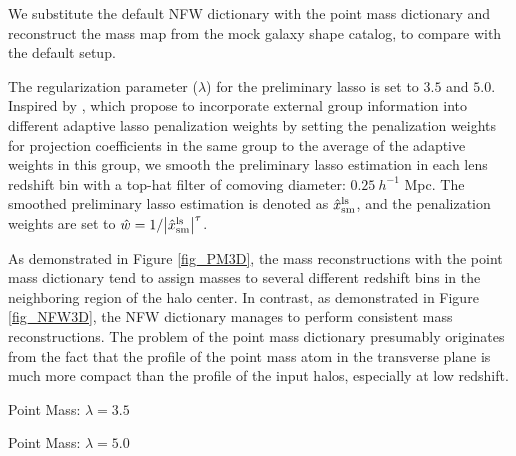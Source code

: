 
We substitute the default NFW dictionary with the point mass dictionary and
reconstruct the mass map from the mock galaxy shape catalog, to compare with
the default setup.

The regularization parameter ($\lambda$) for the preliminary lasso is set to
$3.5$ and $5.0$.  Inspired by \citet{structureAdaLasso-Pramanik2020}, which
propose to incorporate external group information into different adaptive lasso
penalization weights by setting the penalization weights for projection
coefficients in the same group to the average of the adaptive weights in this
group, we smooth the preliminary lasso estimation in each lens redshift bin
with a top-hat filter of comoving diameter: $0.25~h^{-1}$ Mpc. The smoothed
preliminary lasso estimation is denoted as $\hat{x}^{\rm{ls}}_{\rm{sm}}$, and
the penalization weights are set to
$\hat{w}=1/\abs{\hat{x}^{\rm{ls}}_{\rm{sm}}}^\tau$.

As demonstrated in Figure \ref{fig_PM3D}, the mass reconstructions with the
point mass dictionary tend to assign masses to several different redshift bins
in the neighboring region of the halo center.  In contrast, as demonstrated in
Figure \ref{fig_NFW3D}, the NFW dictionary manages to perform consistent mass
reconstructions. The problem of the point mass dictionary presumably originates
from the fact that the profile of the point mass atom in the transverse plane
is much more compact than the profile of the input halos, especially at low
redshift.

\begin{figure*}
\centering
\begin{minipage}[c]{1.0\columnwidth}
    \centering
    \small Point Mass: $\lambda=3.5$
\end{minipage}
\begin{minipage}[c]{1.0\columnwidth}
    \centering
    \small Point Mass: $\lambda=5.0$
\end{minipage}
\caption{The density maps reconstructed from the mock galaxy shape catalog with
    the point mass dictionary. The penalization parameters are $\lambda=3.5$
    (left) and $\lambda=5.0$ (right).  The input halo mass is
    $M_{200}=10^{15.02} ~h^{-1}M_{\odot}$, and its redshift is $z=0.164$.  The
    vertical direction is the line of sight direction. The lower boundaries and
    the upper boundaries of the boxes correspond to $z=0.01$ and $z=0.85$,
    respectively.
    } \label{fig_PM3D}
\end{figure*}
